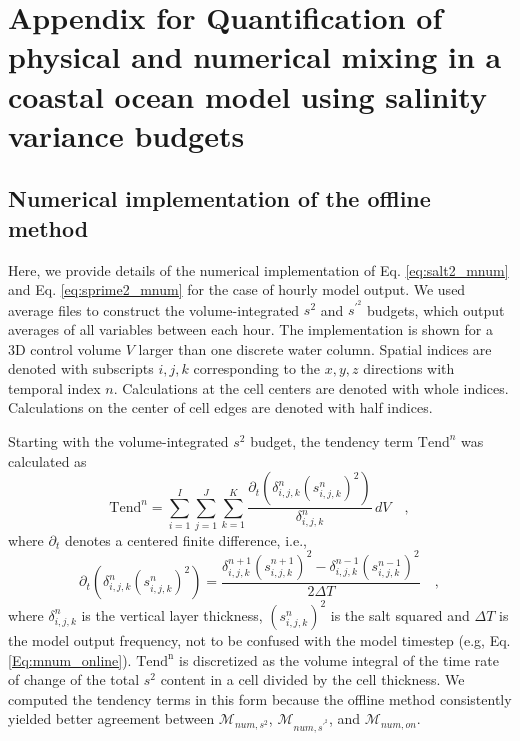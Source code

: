 

\chapter{Appendix for Quantification of physical and numerical mixing in a coastal ocean model using salinity variance budgets}%

\section{Numerical implementation of the offline method} %

Here, we provide details of the numerical implementation of Eq. \ref{eq:salt2_mnum} and Eq. \ref{eq:sprime2_mnum} for the case of hourly model output. We used average files to construct the volume-integrated $s^2$ and $s^{\prime^2}$ budgets, which output averages of all variables between each hour. The implementation is shown for a 3D control volume $V$ larger than one discrete water column. Spatial indices are denoted with subscripts $i,j,k$ corresponding to the $x,y,z$ directions with temporal index $n$. Calculations at the cell centers are denoted with whole indices. Calculations on the center of cell edges are denoted with half indices. 

Starting with the volume-integrated $s^2$ budget, the tendency term $\mathrm{Tend}^n$ was calculated as
\begin{equation} \label{eq:append_tend}
        \mathrm{Tend}^n = \sum_{i=1}^{I}\sum_{j=1}^{J}\sum_{k=1}^{K} \frac{\partial_t \left(\delta_{i,j,k}^n \left(s_{i,j,k}^{n} \right)^2 \right)}{\delta_{i,j,k}^n} \, dV \quad ,
\end{equation}
where $\partial_t$ denotes a centered finite difference, i.e., 
\begin{equation} \label{eq:append_finitediff}
        \partial_t \left(\delta_{i,j,k}^n \left(s_{i,j,k}^{n} \right)^2 \right) = \frac{\delta_{i,j,k}^{n+1} \left(s_{i,j,k}^{n+1} \right)^2-\delta_{i,j,k}^{n-1} \left(s_{i,j,k}^{n-1} \right)^2}{2 \Delta T} \quad ,
\end{equation}
where $\delta_{i,j,k}^n$ is the vertical layer thickness, $(s_{i,j,k}^{n})^2$ is the salt squared and $\Delta T$ is the model output frequency, not to be confused with the model timestep (e.g, Eq. \ref{Eq:mnum_online}). $\mathrm{Tend^n}$ is discretized as the volume integral of the time rate of change of the total $s^2$ content in a cell divided by the cell thickness. We computed the tendency terms in this form because the offline method consistently yielded better agreement between $\mathcal{M}_{num,s^2}$, $\mathcal{M}_{num,s^{\prime^2}}$, and $\mathcal{M}_{num,on}$. 

